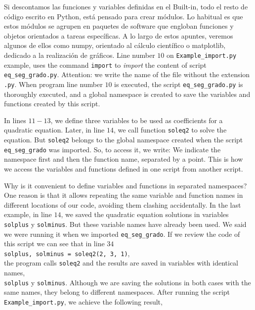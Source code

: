 \begin{paracol}{2}
Si descontamos las funciones y variables definidas en el Built-in, todo el resto de código escrito en Python, está pensado para crear módulos. Lo habitual es que estos módulos se agrupen en paquetes de software que engloban funciones y objetos orientados a tareas específicas. A lo largo de estos apuntes, veremos algunos de ellos como numpy, orientado al cálculo científico o matplotlib, dedicado a la realización de gráficos.
\switchcolumn
Line number $10$ on \texttt{Example_import.py} example, uses the command \texttt{import} to \emph{import} the content of script \texttt{eq_seg_grado.py}. Attention: we write the name of the file without the extension \texttt{.py}. When program line number $10$ is executed, the script \texttt{eq_seg_grado.py} is thoroughly executed, and a global namespace is created to save the variables and functions created by this script.

In lines $11 - 13$, we define three variables to be used as coefficients for a quadratic equation. Later, in line $14$, we call function \texttt{soleq2} to solve the equation. But \texttt{soleq2} belongs to the global namespace created when the script \texttt{eq_seg_grado} was imported. So, to access it, we write:
We indicate the namespace first and then the function name, separated by a point. This is how we access the variables and functions defined in one script from another script. 

Why is it convenient to define variables and functions in separated namespaces? One reason is that it allows repeating the same variable and function names in different locations of our code, avoiding them clashing accidentally. In the last example, in line $14$, we saved the quadratic equation solutions in variables \texttt{solplus} y \texttt{solminus}. But these variable names have already been used. We said we were running it when we imported \texttt{eq_seg_grado}. If we review the code of this script we can see that in line $34$\\ \texttt{solplus, solminus = soleq2(2, 3, 1)},\\ the program calls \texttt{soleq2} and the results are saved in variables with identical names,\\ \texttt{solplus} y \texttt{solminus}. Although we are saving the solutions in both cases with the same names, they belong to different namespaces. After running the script \texttt{Example_import.py}, we achieve the following result,   


\end{paracol}
